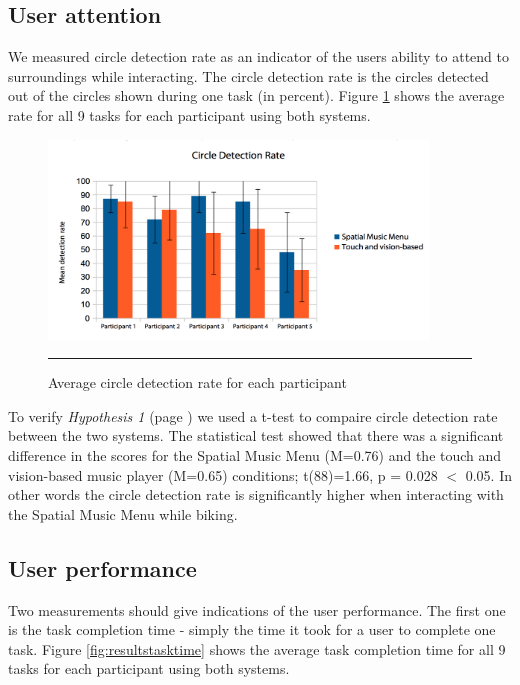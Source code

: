 \subsection{User attention}
We measured circle detection rate as an indicator of the users ability to attend to surroundings while interacting. The circle detection rate is the circles detected out of the circles shown during one task (in percent). Figure \ref{fig:resultscircles} shows the average rate for all 9 tasks for each participant using both systems.

\begin{figure}[h]
	\centering
		\includegraphics[width=0.9\textwidth,height=\textheight,keepaspectratio]{./Figures/results_circledetections.png}
		\rule{35em}{1pt}
	\caption[Results Circle Detection Rate]{Average circle detection rate for each participant}
	\label{fig:resultscircles}
\end{figure}

To verify \textit{Hypothesis 1} (page \pageref{sec:evaluationhypothesis}) we used a t-test to compaire circle detection rate between the two systems. The statistical test showed that there was a significant difference in the scores for the Spatial Music Menu (M=0.76) and the touch and vision-based music player (M=0.65) conditions; t(88)=1.66, p = 0.028 $<$ 0.05. In other words the circle detection rate is significantly higher when interacting with the Spatial Music Menu while biking.

\subsection{User performance}
Two measurements should give indications of the user performance. The first one is the task completion time - simply the time it took for a user to complete one task. Figure \ref{fig:resultstasktime} shows the average task completion time for all 9 tasks for each participant using both systems.


